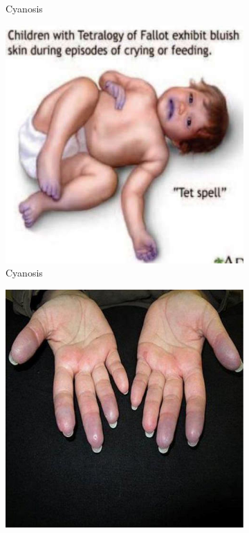 \documentclass[a4paper,12pt,openany,oneside]{book}
\begin{document}
{\begin{figure}[h]
\begin{subfigure}[t]{.23\textwidth}
																	\caption{Cyanosis}
																	\label{cyanosis1}
																\end{subfigure}
																\hspace{\fill}
																\begin{subfigure}[t]{.23\textwidth}
																	\centering
																	\includegraphics[width=\textwidth]{./clinicalPhysioPic/cyanosis4-1.jpg}
																	\caption{Cyanosis}
																	\label{cyanosis2}
																\end{subfigure}
																\hspace{\fill}
																\begin{subfigure}[t]{.23\textwidth}
																	\centering
																	\includegraphics[width=\textwidth]{./clinicalPhysioPic/cyanosis4-2.jpg}

\end{subfigure}
\end{figure}}
\end{document}
